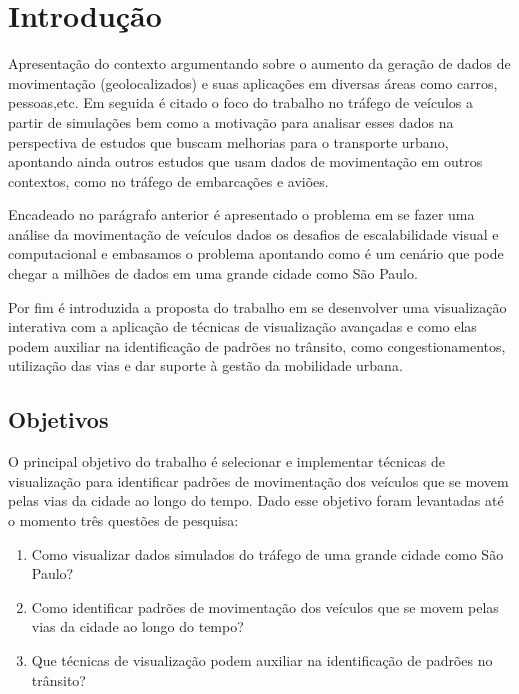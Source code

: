 \chapter{Introdução}
\label{cap:introducao}

Apresentação do contexto argumentando sobre o aumento da geração de dados de
movimentação (geolocalizados) e suas aplicações em diversas áreas como carros,
pessoas,etc. Em seguida é citado o foco do trabalho no tráfego de veículos a
partir de simulações bem como a motivação para analisar esses dados na
perspectiva de estudos que buscam melhorias para o transporte urbano, apontando
ainda outros estudos que usam dados de movimentação em outros contextos, como
no tráfego de embarcações e aviões.


Encadeado no parágrafo anterior é apresentado o problema em se fazer
uma análise da movimentação de veículos dados os desafios de escalabilidade
visual e computacional e embasamos o problema apontando como é um cenário que
pode chegar a milhões de dados em uma grande cidade como São Paulo.

Por fim é introduzida a proposta do trabalho em se
desenvolver uma visualização interativa com a aplicação de técnicas de
visualização avançadas e como elas podem auxiliar na identificação de padrões
no trânsito, como congestionamentos, utilização das vias e dar suporte 
à gestão da mobilidade urbana.

\section{Objetivos}
\label{sec:objetivos}

O principal objetivo do trabalho é selecionar e implementar técnicas de
visualização para identificar padrões de movimentação dos veículos que se movem
pelas vias da cidade ao longo do tempo. Dado esse objetivo foram levantadas até
o momento três questões de pesquisa:

\begin{enumerate} 
  \item Como visualizar dados simulados do tráfego de uma grande cidade como
São Paulo?

  \item Como identificar padrões de movimentação dos veículos que se movem
pelas vias da cidade ao longo do tempo?
        
  \item Que técnicas de visualização podem auxiliar na identificação de padrões
no trânsito?
\end{enumerate}

